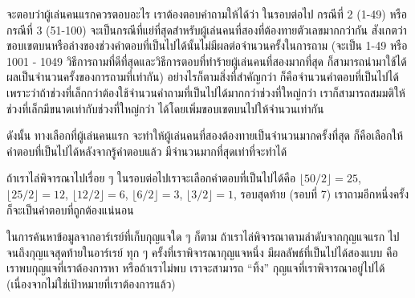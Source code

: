 \begin{quizans}
จะ{\wbr}ตอบ{\wbr}ว่า{\wbr}ผู้{\wbr}เล่น{\wbr}คน{\wbr}แรก{\wbr}ควร{\wbr}ตอบ{\wbr}อะไร เรา{\wbr}ต้อง{\wbr}ตอบ{\wbr}คำถาม{\wbr}ให้{\wbr}ได้{\wbr}ว่า ใน{\wbr}รอบ{\wbr}ต่อไป กรณี{\wbr}ที่ 2
(1-49) หรือ{\wbr}กรณี{\wbr}ที่ 3 (51-100)
จะ{\wbr}เป็น{\wbr}กรณี{\wbr}ที่{\wbr}แย่{\wbr}ที่สุด{\wbr}สำหรับ{\wbr}ผู้{\wbr}เล่น{\wbr}คน{\wbr}ที่{\wbr}สอง{\wbr}ที่{\wbr}ต้อง{\wbr}ทาย{\wbr}ตัวเลข{\wbr}มาก{\wbr}กว่า{\wbr}กัน{\wbr}
สังเกต{\wbr}ว่า{\wbr}ขอบเขต{\wbr}บน{\wbr}หรือ{\wbr}ล่าง{\wbr}ของ{\wbr}ช่วง{\wbr}คำตอบ{\wbr}ที่{\wbr}เป็น{\wbr}ไป{\wbr}ได้{\wbr}นั้น{\wbr}ไม่{\wbr}มี{\wbr}ผล{\wbr}ต่อ{\wbr}จำนวน{\wbr}ครั้ง{\wbr}ใน{\wbr}การ{\wbr}ถาม{\wbr}
(จะ{\wbr}เป็น 1-49 หรือ 1001 - 1049
วิธีการ{\wbr}ถาม{\wbr}ที่{\wbr}ดี{\wbr}ที่สุด{\wbr}และ{\wbr}วิธีการ{\wbr}ตอบ{\wbr}ที่{\wbr}ทำร้าย{\wbr}ผู้{\wbr}เล่น{\wbr}คน{\wbr}ที่{\wbr}สอง{\wbr}มาก{\wbr}ที่สุด{\wbr}
ก็{\wbr}สามารถ{\wbr}นำมา{\wbr}ใช้ได้{\wbr}ผล{\wbr}เป็น{\wbr}จำนวน{\wbr}ครั้ง{\wbr}ของ{\wbr}การ{\wbr}ถาม{\wbr}ที่{\wbr}เท่า{\wbr}กัน) อย่างไรก็ตาม{\wbr}สิ่ง{\wbr}ที่{\wbr}สำคัญ{\wbr}กว่า{\wbr}
ก็{\wbr}คือ{\wbr}จำนวน{\wbr}คำตอบ{\wbr}ที่{\wbr}เป็น{\wbr}ไป{\wbr}ได้{\wbr}
เพราะว่า{\wbr}ถ้า{\wbr}ช่วง{\wbr}ที่{\wbr}เล็ก{\wbr}กว่า{\wbr}ต้อง{\wbr}ใช้{\wbr}จำนวน{\wbr}คำถาม{\wbr}ที่{\wbr}เป็น{\wbr}ไป{\wbr}ได้{\wbr}มาก{\wbr}กว่า{\wbr}ช่วง{\wbr}ที่{\wbr}ใหญ่{\wbr}กว่า{\wbr}
เรา{\wbr}ก็{\wbr}สามารถ{\wbr}สมมติ{\wbr}ให้{\wbr}ช่วง{\wbr}ที่{\wbr}เล็ก{\wbr}มี{\wbr}ขนาด{\wbr}เท่า{\wbr}กับ{\wbr}ช่วง{\wbr}ที่{\wbr}ใหญ่{\wbr}กว่า{\wbr}
ได้{\wbr}โดย{\wbr}เพิ่ม{\wbr}ขอบเขต{\wbr}บน{\wbr}ไป{\wbr}ให้{\wbr}จำนวน{\wbr}เท่า{\wbr}กัน 

ดังนั้น ทางเลือก{\wbr}ที่{\wbr}ผู้{\wbr}เล่น{\wbr}คน{\wbr}แรก จะ{\wbr}ทำ{\wbr}ให้{\wbr}ผู้{\wbr}เล่น{\wbr}คน{\wbr}ที่{\wbr}สอง{\wbr}ต้อง{\wbr}ทาย{\wbr}เป็น{\wbr}จำนวน{\wbr}มาก{\wbr}ครั้ง{\wbr}ที่สุด{\wbr}
ก็{\wbr}คือ{\wbr}เลือก{\wbr}ให้{\wbr}คำตอบ{\wbr}ที่{\wbr}เป็น{\wbr}ไป{\wbr}ได้{\wbr}หลังจาก{\wbr}รู้{\wbr}คำตอบ{\wbr}แล้ว มี{\wbr}จำนวน{\wbr}มาก{\wbr}ที่สุด{\wbr}เท่า{\wbr}ที่{\wbr}จะ{\wbr}ทำ{\wbr}ได้{\wbr}

ถ้า{\wbr}เรา{\wbr}ไล่{\wbr}พิจารณา{\wbr}ไป{\wbr}เรื่อย ๆ ใน{\wbr}รอบ{\wbr}ต่อไป{\wbr}เรา{\wbr}จะ{\wbr}เลือก{\wbr}คำตอบ{\wbr}ที่{\wbr}เป็น{\wbr}ไป{\wbr}ได้{\wbr}คือ $\lfloor
50/2\rfloor=25$, $\lfloor 25/2\rfloor=12$, $\lfloor 12/2\rfloor=6$,
$\lfloor 6/2\rfloor=3$, $\lfloor 3/2\rfloor=1$, รอบ{\wbr}สุดท้าย (รอบ{\wbr}ที่ 7)
เรา{\wbr}ถาม{\wbr}อีก{\wbr}หนึ่ง{\wbr}ครั้ง ก็{\wbr}จะ{\wbr}เป็น{\wbr}คำตอบ{\wbr}ที่{\wbr}ถูกต้อง{\wbr}แน่นอน{\wbr}
\end{quizans}

ใน{\wbr}การ{\wbr}ค้นหา{\wbr}ข้อมูล{\wbr}จาก{\wbr}อาร์เรย์{\wbr}ที่{\wbr}เก็บ{\wbr}กุญแจ{\wbr}ใด ๆ ก็ตาม ถ้า{\wbr}เรา{\wbr}ไล่{\wbr}พิจารณา{\wbr}ตาม{\wbr}ลำดับ{\wbr}จาก{\wbr}กุญแจ{\wbr}แรก{\wbr}
ไป{\wbr}จนถึง{\wbr}กุญแจ{\wbr}สุดท้าย{\wbr}ใน{\wbr}อาร์เรย์ ทุก ๆ ครั้ง{\wbr}ที่{\wbr}เรา{\wbr}พิจารณา{\wbr}กุญแจ{\wbr}หนึ่ง มี{\wbr}ผลลัพธ์{\wbr}ที่{\wbr}เป็น{\wbr}ไป{\wbr}ได้{\wbr}สอง{\wbr}แบบ{\wbr}
คือ เรา{\wbr}พบ{\wbr}กุญแจ{\wbr}ที่{\wbr}เรา{\wbr}ต้องการ{\wbr}หา หรือ{\wbr}ถ้า{\wbr}เรา{\wbr}ไม่{\wbr}พบ เรา{\wbr}จะ{\wbr}สามารถ ``ทิ้ง''
กุญแจ{\wbr}ที่{\wbr}เรา{\wbr}พิจารณา{\wbr}อยู่{\wbr}ไป{\wbr}ได้ (เนื่องจาก{\wbr}ไม่{\wbr}ใช่{\wbr}เป้าหมาย{\wbr}ที่{\wbr}เรา{\wbr}ต้องการ{\wbr}แล้ว)

